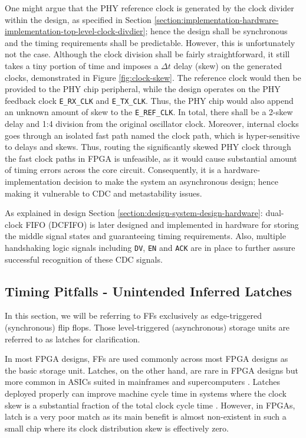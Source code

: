 \documentclass[a4paper]{report}
\newcommand{\code}{\texttt}
\begin{document}
One might argue that the PHY reference clock is generated by the clock divider within the design, as specified in Section \ref{section:implementation-hardware-implementation-top-level-clock-divdier}; hence the design shall be synchronous and the timing requirements shall be predictable. However, this is unfortunately not the case. Although the clock division shall be fairly straightforward, it still takes a tiny portion of time and imposes a $\Delta t$ delay (skew) on the generated clocks, demonstrated in Figure \ref{fig:clock-skew}. The reference clock would then be provided to the PHY chip peripheral, while the design operates on the PHY feedback clock \code{E\_RX\_CLK} and \code{E\_TX\_CLK}. Thus, the PHY chip would also append an unknown amount of skew to the \code{E\_REF\_CLK}. In total, there shall be a 2-skew delay and 1:4 division from the original oscillator clock. Moreover, internal clocks goes through an isolated fast path named the clock path, which is hyper-sensitive to delays and skews. Thus, routing the significantly skewed PHY clock through the fast clock paths in FPGA is unfeasible, as it would cause substantial amount of timing errors across the core circuit. Consequently, it is a hardware-implementation decision to make the system an asynchronous design; hence making it vulnerable to CDC and metastability issues.
 
As explained in design Section \ref{section:design-system-design-hardware}: dual-clock FIFO (DCFIFO) is later designed and implemented in hardware for storing the middle signal states and guaranteeing timing requirements. Also, multiple handshaking logic signals including \code{DV}, \code{EN} and \code{ACK} are in place to further assure successful recognition of these CDC signals.

\subsection{Timing Pitfalls - Unintended Inferred Latches}

In this section, we will be referring to FFs exclusively as edge-triggered (synchronous) flip flops. Those level-triggered (asynchronous) storage units are referred to as latches for clarification.

In most FPGA designs, FFs are used commonly across most FPGA designs as the basic storage unit. Latches, on the other hand, are rare in FPGA designs but more common in ASICs suited in mainframes and supercomputers \cite{vasumathi-2018}. Latches deployed properly can improve machine cycle time in systems where the clock skew is a substantial fraction of the total clock cycle time \cite{vasumathi-2018}. However, in FPGAs, latch is a very poor match as its main benefit is almost non-existent in such a small chip where its clock distribution skew is effectively zero.
\end{document}
